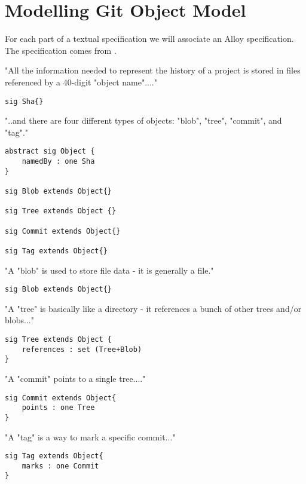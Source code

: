 \section{Modelling Git Object Model}

For each part of a textual 
specification we will associate an Alloy specification.
The specification comes from \cite{gitComm}. \par

"All the information needed to represent the history
of a project is stored in files referenced by a 
40-digit "object name"...."


\begin{lstlisting}
sig Sha{}
\end{lstlisting}

"..and there are four different types of objects: "blob",
"tree", "commit", and "tag"."

\begin{lstlisting}
abstract sig Object {
	namedBy : one Sha
}

sig Blob extends Object{}

sig Tree extends Object {}

sig Commit extends Object{}

sig Tag extends Object{}
\end{lstlisting}

"A "blob" is used to store file data - it is generally
a file."

\begin{lstlisting}
sig Blob extends Object{}
\end{lstlisting}

"A "tree" is basically like a directory - it references a bunch
of other trees and/or blobs..."

\begin{lstlisting}
sig Tree extends Object {
	references : set (Tree+Blob)
}
\end{lstlisting}


"A "commit" points to a single tree...."

\begin{lstlisting}
sig Commit extends Object{
	points : one Tree
}

\end{lstlisting}

"A "tag" is a way to mark a specific commit..."

\begin{lstlisting}
sig Tag extends Object{
	marks : one Commit
}
\end{lstlisting}

